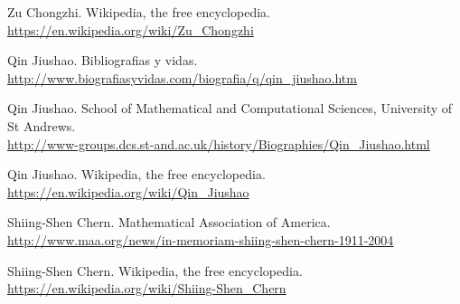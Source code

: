 \begin{thebibliography}{10}
Zu Chongzhi. Wikipedia, the free encyclopedia.\\
  \url{https://en.wikipedia.org/wiki/Zu_Chongzhi}
  
Qin Jiushao. Bibliografias y vidas.\\
  \url{http://www.biografiasyvidas.com/biografia/q/qin_jiushao.htm}

Qin Jiushao. School of Mathematical and Computational Sciences, University of St Andrews.\\
  \url{http://www-groups.dcs.st-and.ac.uk/history/Biographies/Qin_Jiushao.html}

Qin Jiushao. Wikipedia, the free encyclopedia.\\
  \url{https://en.wikipedia.org/wiki/Qin_Jiushao}

Shiing-Shen Chern. Mathematical Association of America.\\
  \url{http://www.maa.org/news/in-memoriam-shiing-shen-chern-1911-2004}

Shiing-Shen Chern. Wikipedia, the free encyclopedia.\\
  \url{https://en.wikipedia.org/wiki/Shiing-Shen_Chern}

\end{thebibliography}
